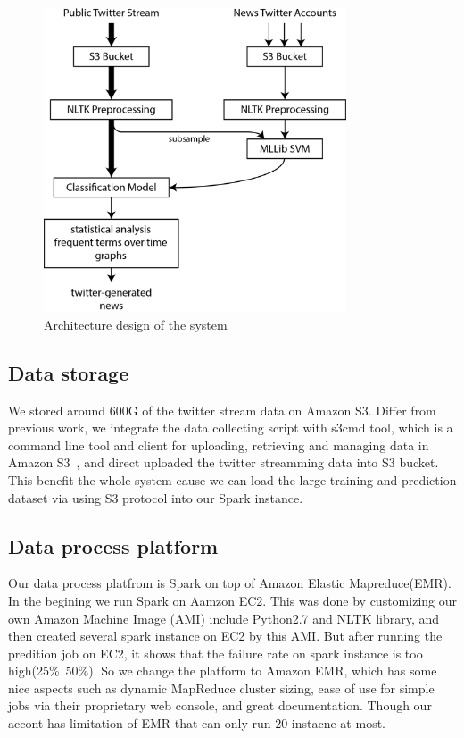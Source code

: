 \documentclass{llncs}
\begin{document}
\begin{figure}[H]
	\centering
	\includegraphics[width=0.8\textwidth]{images/system_arch.png} 
	\caption{Architecture design of the system}
	\label{fig:Architecture design of the system}
\end{figure}

\subsection{Data storage}
We stored around 600G of the twitter stream data on Amazon S3. Differ from previous work, we integrate the data collecting script with s3cmd tool, which is a command line tool and client for uploading, retrieving and managing data in Amazon S3~\cite{s3cmd}, and direct uploaded the twitter streamming data into S3 bucket. This benefit the whole system cause we can load the large training and prediction dataset via using S3 protocol into our Spark instance. 

\subsection{Data process platform}
Our data process platfrom is Spark on top of Amazon Elastic Mapreduce(EMR). In the begining we run Spark on Aamzon EC2. This was done by customizing our own Amazon Machine Image (AMI) include Python2.7 and NLTK library, and then created several spark instance on EC2 by this AMI. But after running the predition job on EC2, it shows that the failure rate on spark instance is too high(25\%~50\%). So we change the platform to Amazon EMR, which has some nice aspects such as dynamic MapReduce cluster sizing, ease of use for simple jobs via their proprietary web console, and great documentation. Though our accont has limitation of EMR that can only run 20 instacne at most. 
\end{document}
